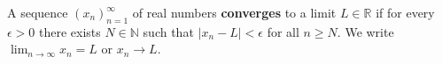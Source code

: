 A sequence $(x_n)_{n=1}^{\infty}$ of real numbers \textbf{converges} to a limit $L \in \mathbb{R}$ if for every $\epsilon > 0$ there exists $N \in \mathbb{N}$ such that $|x_n - L| < \epsilon$ for all $n \geq N$. We write $\lim_{n \to \infty} x_n = L$ or $x_n \to L$.
